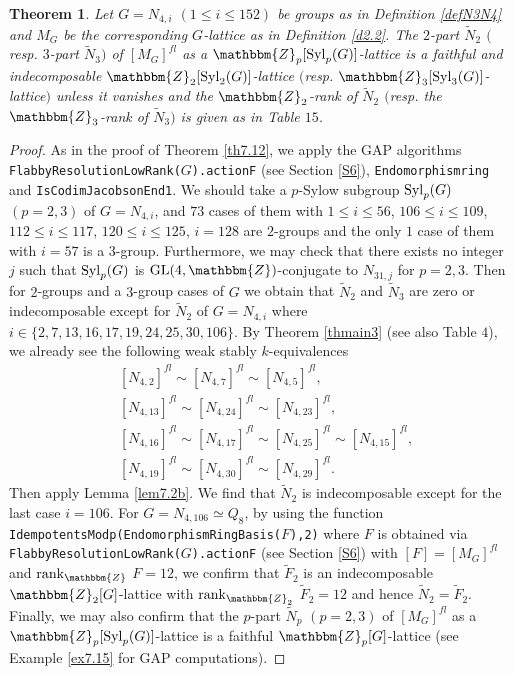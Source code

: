 \documentclass{amsart}
\theoremstyle{plain}
\newtheorem{theorem}{Theorem}[section]
\theoremstyle{definition}
\theoremstyle{remark}
\newcommand{\bZ}{\mathbbm{Z}}\newcommand{\bQ}{\mathbbm{Q}}
\newcommand{\GL}{{\rm GL}}\newcommand{\SL}{{\rm SL}}
\newcommand{\Syl}{{\rm Syl}}
\newcounter{sub}\def\tr{\mbox{tr }}
\begin{document}
%
\begin{theorem}\label{th7.13}
Let $G=N_{4,i}$ $(1\leq i\leq 152)$ be groups as in Definition \ref{defN3N4} 
and $M_G$ be the corresponding $G$-lattice as in Definition \ref{d2.2}. 
The $2$-part $\widetilde{N}_2$ $($resp. $3$-part $\widetilde{N}_3$$)$ 
of $[M_G]^{fl}$ as a $\bZ_p[\Syl_p(G)]$-lattice 
is a faithful and indecomposable $\bZ_2[\Syl_2(G)]$-lattice 
$($resp. $\bZ_3[\Syl_3(G)]$-lattice$)$ unless it vanishes 
and the $\bZ_2$-rank of 
$\widetilde{N}_2$ $($resp. the $\bZ_3$-rank of $\widetilde{N}_3$$)$ 
is given as in {\rm Table} $15$. 
\end{theorem}
%
\begin{proof}
As in the proof of Theorem \ref{th7.12}, 
we apply the GAP algorithms 
{\tt FlabbyResolutionLowRank($G$).actionF} (see Section \ref{S6}), 
{\tt Endomorphismring} and  
{\tt IsCodimJacobsonEnd1}. 
We should take a $p$-Sylow subgroup $\Syl_p(G)$ $(p=2,3)$ of $G=N_{4,i}$, 
and $73$ cases of them with $1\leq i\leq 56$, $106\leq i\leq 109$, 
$112\leq i\leq 117$, $120\leq i\leq 125$, $i=128$ are $2$-groups 
and the only $1$ case of them with $i=57$ is a $3$-group. 
Furthermore, 
we may check that there exists 
no integer $j$ such that $\Syl_p(G)$ is $\GL(4,\bZ)$-conjugate 
to $N_{31,j}$ for $p=2,3$. 
Then for $2$-groups and a $3$-group cases of $G$ 
we obtain that $\widetilde{N}_2$ and $\widetilde{N}_3$ are zero or 
indecomposable except for $\widetilde{N}_2$ of $G=N_{4,i}$ where 
$i\in \{2, 7, 13, 16, 17, 19, 24, 25, 30, 106\}$. 
By Theorem \ref{thmain3} (see also Table $4$), 
we already see the following weak stably $k$-equivalences
\begin{align*}
&[N_{4,2}]^{fl}\sim [N_{4,7}]^{fl}\sim [N_{4,5}]^{fl},\\
&[N_{4,13}]^{fl}\sim [N_{4,24}]^{fl}\sim [N_{4,23}]^{fl},\\
&[N_{4,16}]^{fl}\sim [N_{4,17}]^{fl}\sim [N_{4,25}]^{fl}\sim [N_{4,15}]^{fl},\\
&[N_{4,19}]^{fl}\sim [N_{4,30}]^{fl}\sim [N_{4,29}]^{fl}. 
\end{align*}
Then apply Lemma \ref{lem7.2b}. 
We find that $\widetilde{N}_2$ is indecomposable except for 
the last case $i=106$. 
For $G=N_{4,106}\simeq Q_8$, by using the function 
{\tt IdempotentsModp(EndomorphismRingBasis($F$),2)} 
where $F$ is obtained via {\tt FlabbyResolutionLowRank($G$).actionF} 
(see Section \ref{S6}) with $[F]=[M_G]^{fl}$ and ${\rm rank}_\bZ$ $F=12$, 
we confirm that $\widetilde{F}_2$ is an indecomposable $\bZ_2[G]$-lattice 
with ${\rm rank}_{\bZ_2}$ $\widetilde{F}_2=12$
and hence $\widetilde{N}_2=\widetilde{F}_2$. 
Finally, we may also confirm that the $p$-part $\widetilde{N}_p$ $(p=2,3)$ 
of $[M_G]^{fl}$ as a $\bZ_p[\Syl_p(G)]$-lattice is a faithful 
$\bZ_p[G]$-lattice (see Example \ref{ex7.15} for GAP computations). 
\end{proof}
\end{document}
